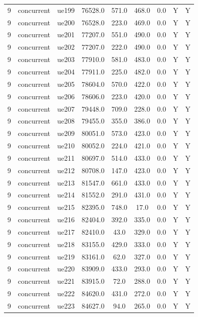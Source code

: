 \begin{table}[ht]
\begin{tabular}{|c|c|c|c|c|c|c|c|c|}
9 & concurrent & ue199 & 76528.0 & 571.0 & 468.0 & 0.0 & Y & Y \\
9 & concurrent & ue200 & 76528.0 & 223.0 & 469.0 & 0.0 & Y & Y \\
9 & concurrent & ue201 & 77207.0 & 551.0 & 490.0 & 0.0 & Y & Y \\
9 & concurrent & ue202 & 77207.0 & 222.0 & 490.0 & 0.0 & Y & Y \\
9 & concurrent & ue203 & 77910.0 & 581.0 & 483.0 & 0.0 & Y & Y \\
9 & concurrent & ue204 & 77911.0 & 225.0 & 482.0 & 0.0 & Y & Y \\
9 & concurrent & ue205 & 78604.0 & 570.0 & 422.0 & 0.0 & Y & Y \\
9 & concurrent & ue206 & 78606.0 & 223.0 & 420.0 & 0.0 & Y & Y \\
9 & concurrent & ue207 & 79448.0 & 709.0 & 228.0 & 0.0 & Y & Y \\
9 & concurrent & ue208 & 79455.0 & 355.0 & 386.0 & 0.0 & Y & Y \\
9 & concurrent & ue209 & 80051.0 & 573.0 & 423.0 & 0.0 & Y & Y \\
9 & concurrent & ue210 & 80052.0 & 224.0 & 421.0 & 0.0 & Y & Y \\
9 & concurrent & ue211 & 80697.0 & 514.0 & 433.0 & 0.0 & Y & Y \\
9 & concurrent & ue212 & 80708.0 & 147.0 & 423.0 & 0.0 & Y & Y \\
9 & concurrent & ue213 & 81547.0 & 661.0 & 433.0 & 0.0 & Y & Y \\
9 & concurrent & ue214 & 81552.0 & 291.0 & 431.0 & 0.0 & Y & Y \\
9 & concurrent & ue215 & 82395.0 & 748.0 & 17.0 & 0.0 & Y & Y \\
9 & concurrent & ue216 & 82404.0 & 392.0 & 335.0 & 0.0 & Y & Y \\
9 & concurrent & ue217 & 82410.0 & 43.0 & 329.0 & 0.0 & Y & Y \\
9 & concurrent & ue218 & 83155.0 & 429.0 & 333.0 & 0.0 & Y & Y \\
9 & concurrent & ue219 & 83161.0 & 62.0 & 327.0 & 0.0 & Y & Y \\
9 & concurrent & ue220 & 83909.0 & 433.0 & 293.0 & 0.0 & Y & Y \\
9 & concurrent & ue221 & 83915.0 & 72.0 & 288.0 & 0.0 & Y & Y \\
9 & concurrent & ue222 & 84620.0 & 431.0 & 272.0 & 0.0 & Y & Y \\
9 & concurrent & ue223 & 84627.0 & 94.0 & 265.0 & 0.0 & Y & Y \\

\end{tabular}
\end{table}
